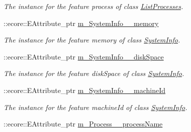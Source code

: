 \begin{DoxyCompactItemize}
\begin{DoxyCompactList}\small\item\em The instance for the feature process of class \hyperlink{classIMS__Data_1_1ListProcesses}{ListProcesses}. \item\end{DoxyCompactList}\item 
\hypertarget{classIMS__Data_1_1IMS__DataPackage_a7412d4e5c28cd27851f2846af8bb6a9d}{
::ecore::EAttribute\_\-ptr \hyperlink{classIMS__Data_1_1IMS__DataPackage_a7412d4e5c28cd27851f2846af8bb6a9d}{m\_\-SystemInfo\_\-\_\-memory}}
\label{classIMS__Data_1_1IMS__DataPackage_a7412d4e5c28cd27851f2846af8bb6a9d}

\begin{DoxyCompactList}\small\item\em The instance for the feature memory of class \hyperlink{classIMS__Data_1_1SystemInfo}{SystemInfo}. \item\end{DoxyCompactList}\item 
\hypertarget{classIMS__Data_1_1IMS__DataPackage_a734671a3b5fe876b09b7b9412d777e6a}{
::ecore::EAttribute\_\-ptr \hyperlink{classIMS__Data_1_1IMS__DataPackage_a734671a3b5fe876b09b7b9412d777e6a}{m\_\-SystemInfo\_\-\_\-diskSpace}}
\label{classIMS__Data_1_1IMS__DataPackage_a734671a3b5fe876b09b7b9412d777e6a}

\begin{DoxyCompactList}\small\item\em The instance for the feature diskSpace of class \hyperlink{classIMS__Data_1_1SystemInfo}{SystemInfo}. \item\end{DoxyCompactList}\item 
\hypertarget{classIMS__Data_1_1IMS__DataPackage_a103052b4e6737356edc419d74bb4cb13}{
::ecore::EAttribute\_\-ptr \hyperlink{classIMS__Data_1_1IMS__DataPackage_a103052b4e6737356edc419d74bb4cb13}{m\_\-SystemInfo\_\-\_\-machineId}}
\label{classIMS__Data_1_1IMS__DataPackage_a103052b4e6737356edc419d74bb4cb13}

\begin{DoxyCompactList}\small\item\em The instance for the feature machineId of class \hyperlink{classIMS__Data_1_1SystemInfo}{SystemInfo}. \item\end{DoxyCompactList}\item 
\hypertarget{classIMS__Data_1_1IMS__DataPackage_a46580dfb4db05b7b32c7909fd48df5dd}{
::ecore::EAttribute\_\-ptr \hyperlink{classIMS__Data_1_1IMS__DataPackage_a46580dfb4db05b7b32c7909fd48df5dd}{m\_\-Process\_\-\_\-processName}}
\label{classIMS__Data_1_1IMS__DataPackage_a46580dfb4db05b7b32c7909fd48df5dd}


\end{DoxyCompactItemize}
